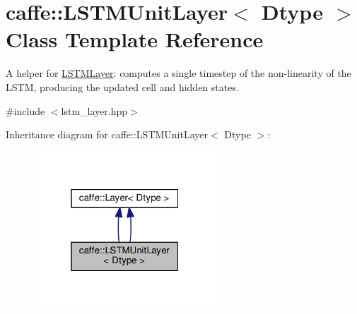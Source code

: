 \hypertarget{classcaffe_1_1_l_s_t_m_unit_layer}{}\section{caffe\+:\+:L\+S\+T\+M\+Unit\+Layer$<$ Dtype $>$ Class Template Reference}
\label{classcaffe_1_1_l_s_t_m_unit_layer}


A helper for \mbox{\hyperlink{classcaffe_1_1_l_s_t_m_layer}{L\+S\+T\+M\+Layer}}\+: computes a single timestep of the non-\/linearity of the L\+S\+TM, producing the updated cell and hidden states.  




{\ttfamily \#include $<$lstm\+\_\+layer.\+hpp$>$}



Inheritance diagram for caffe\+:\+:L\+S\+T\+M\+Unit\+Layer$<$ Dtype $>$\+:
\nopagebreak
\begin{figure}[H]
\begin{center}
\leavevmode
\includegraphics[width=193pt]{classcaffe_1_1_l_s_t_m_unit_layer__inherit__graph}
\end{center}
\end{figure}
